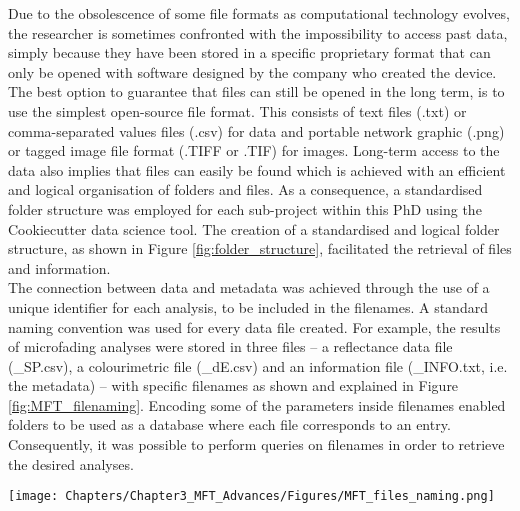 Due to the obsolescence of some file formats as computational technology evolves, the researcher is sometimes confronted with the impossibility to access past data, simply because they have been stored in a specific proprietary format that can only be opened with software designed by the company who created the device. The best option to guarantee that files can still be opened in the long term, is to use the simplest open-source file format. This consists of text files (.txt) or comma-separated values files (.csv) for data and portable network graphic (.png) or tagged image file format (.TIFF or .TIF) for images. Long-term access to the data also implies that files can easily be found which is achieved with an efficient and logical organisation of folders and files. As a consequence, a standardised folder structure was employed for each sub-project within this PhD using the Cookiecutter data science tool. The creation of a standardised and logical folder structure, as shown in Figure \ref{fig:folder_structure}, facilitated the retrieval of files and information.\\


The connection between data and metadata was achieved through the use of a unique identifier for each analysis, to be included in the filenames. A standard naming convention was used for every data file created. For example, the results of microfading analyses were stored in three files – a reflectance data file (\_SP.csv), a colourimetric file (\_dE.csv) and an information file (\_INFO.txt, i.e. the metadata) – with specific filenames as shown and explained in Figure \ref{fig:MFT_filenaming}. Encoding some of the parameters inside filenames enabled folders to be used as a database where each file corresponds to an entry. Consequently, it was possible to perform queries on filenames in order to retrieve the desired analyses.\\

\begin{figure*}[!h]
\centering
\texttt{[image: Chapters/Chapter3\_MFT\_Advances/Figures/MFT\_files\_naming.png]}
\caption[\hspace{0.3cm}Naming of microfading analyses files]{Naming of microfading analyses files.}
\label{fig:MFT_filenaming}
\end{figure*}

